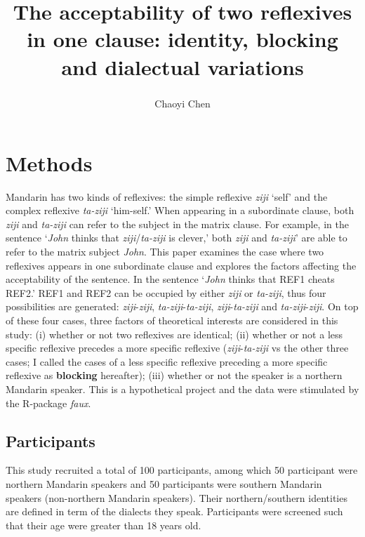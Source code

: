 \documentclass[
  english,
  man,floatsintext]{apa6}
\title{The acceptability of two reflexives in one clause: identity, blocking and dialectual variations}
\author{Chaoyi Chen\textsuperscript{}}
\date{}
\affiliation{\vspace{0.5cm}\textsuperscript{1} Rutgers University}
\begin{document}
\maketitle

\hypertarget{methods}{%
\section{Methods}\label{methods}}

Mandarin has two kinds of reflexives: the simple reflexive \emph{ziji} `self' and the complex reflexive \emph{ta-ziji} `him-self.' When appearing in a subordinate clause, both \emph{ziji} and \emph{ta-ziji} can refer to the subject in the matrix clause. For example, in the sentence `\emph{John} thinks that \emph{ziji}/\emph{ta-ziji} is clever,' both \emph{ziji} and \emph{ta-ziji}' are able to refer to the matrix subject \emph{John}. This paper examines the case where two reflexives appears in one subordinate clause and explores the factors affecting the acceptability of the sentence. In the sentence `\emph{John} thinks that REF1 cheats REF2.' REF1 and REF2 can be occupied by either \emph{ziji} or \emph{ta-ziji}, thus four possibilities are generated: \emph{ziji}-\emph{ziji}, \emph{ta-ziji}-\emph{ta-ziji}, \emph{ziji}-\emph{ta-ziji} and \emph{ta-ziji}-\emph{ziji}. On top of these four cases, three factors of theoretical interests are considered in this study: (i) whether or not two reflexives are identical; (ii) whether or not a less specific reflexive precedes a more specific reflexive (\emph{ziji}-\emph{ta-ziji} vs the other three cases; I called the cases of a less specific reflexive preceding a more specific reflexive as \textbf{blocking} hereafter); (iii) whether or not the speaker is a northern Mandarin speaker. This is a hypothetical project and the data were stimulated by the R-package \emph{faux}.

\hypertarget{participants}{%
\subsection{Participants}\label{participants}}

This study recruited a total of 100 participants, among which 50 participant were northern Mandarin speakers and 50 participants were southern Mandarin speakers (non-northern Mandarin speakers). Their northern/southern identities are defined in term of the dialects they speak. Participants were screened such that their age were greater than 18 years old.
\end{document}
